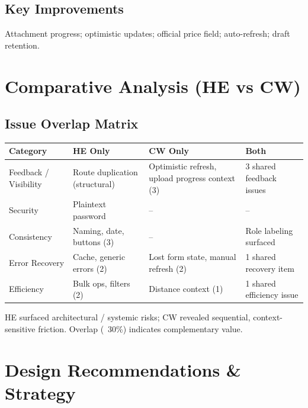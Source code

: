 \documentclass[11pt,a4paper]{article}
\begin{document}
\subsection{Key Improvements}
Attachment progress; optimistic updates; official price field; auto-refresh; draft retention.

\section{Comparative Analysis (HE vs CW)}
\subsection{Issue Overlap Matrix}
\begin{longtable}{@{}L{3.2cm}L{3cm}L{4.2cm}L{3cm}@{}}
\toprule
\textbf{Category} & \textbf{HE Only} & \textbf{CW Only} & \textbf{Both}\\\midrule
Feedback / Visibility & Route duplication (structural) & Optimistic refresh, upload progress context (3) & 3 shared feedback issues \\
Security & Plaintext password & -- & -- \\
Consistency & Naming, date, buttons (3) & -- & Role labeling surfaced \\
Error Recovery & Cache, generic errors (2) & Lost form state, manual refresh (2) & 1 shared recovery item \\
Efficiency & Bulk ops, filters (2) & Distance context (1) & 1 shared efficiency issue \\
\bottomrule
\end{longtable}

HE surfaced architectural / systemic risks; CW revealed sequential, context-sensitive friction. Overlap (~30\%) indicates complementary value.

\section{Design Recommendations \& Strategy}
\end{document}
